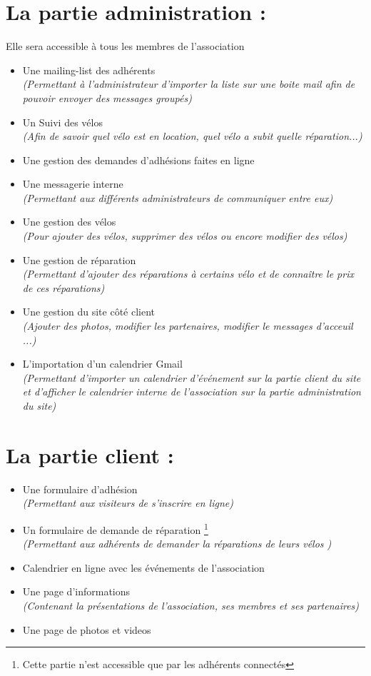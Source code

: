 \documentclass[11pt,a4paper,titlepage]{report}
\begin{document}
\section{La partie administration :} 
Elle sera accessible à tous les membres de l'association \\
\begin{itemize}
\item Une mailing-list des adhérents \\
\textit{(Permettant à l'administrateur d'importer la liste sur une boite mail afin de pouvoir envoyer des messages groupés)}
\item Un Suivi des vélos \\
\textit{(Afin de savoir quel vélo est en location, quel vélo a subit quelle réparation...)}
\item Une gestion des demandes d'adhésions faites en ligne
\item Une messagerie interne \\
\textit{(Permettant aux différents administrateurs de communiquer entre eux)}
\item Une gestion des vélos \\
\textit{(Pour ajouter des vélos, supprimer des vélos ou encore modifier des vélos)}
\item Une gestion de réparation \\
\textit{(Permettant d'ajouter des réparations à certains vélo et de connaître le prix de ces réparations)}
\item Une gestion du site côté client \\
\textit{(Ajouter des photos, modifier les partenaires, modifier le messages d'acceuil ...)}
\item L'importation d'un calendrier Gmail \\
\textit{(Permettant d'importer un calendrier d’événement sur la partie client du site et d'afficher le calendrier interne de l'association sur la partie administration du site)}
\end{itemize}

  
  
\section{ La partie client :}

\begin{itemize}
\item Une formulaire d'adhésion \\
\textit{(Permettant aux visiteurs de s'inscrire en ligne)}
\item Un formulaire de demande de réparation \footnote{Cette partie n'est accessible que par les adhérents connectés}  \\
\textit{(Permettant aux adhérents de demander la réparations de leurs vélos )}
\item Calendrier en ligne avec les événements de l'association 
\item Une page d'informations  \\
\textit{(Contenant la présentations de l'association, ses membres et ses partenaires)} 
\item Une page de photos et videos  

\end{itemize}
\end{document}

